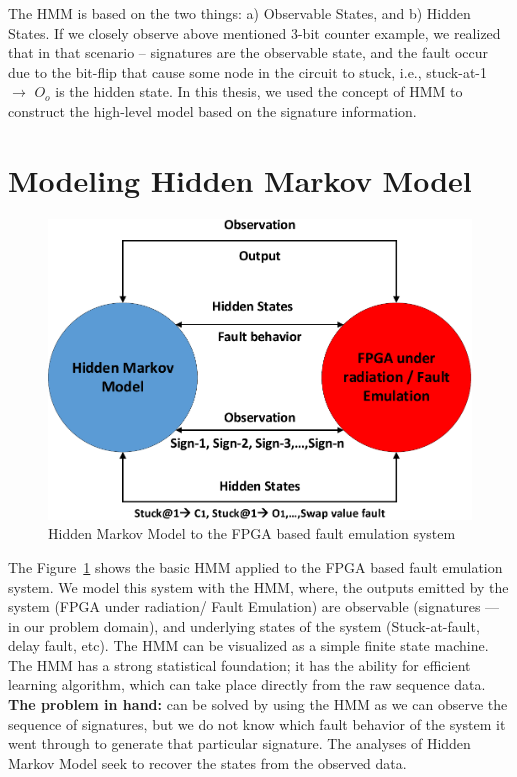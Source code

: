 The HMM is based on  the two things: a) Observable States, and b) Hidden States. If we closely observe above mentioned 3-bit counter example, we realized that in that scenario --  signatures are the observable state, and the fault occur due to the bit-flip that cause some node in the circuit to stuck, i.e., stuck-at-1 $\rightarrow$ $O_o$ is the hidden state. In this thesis, we used the concept of HMM to construct the high-level model based on the signature information.





\section{Modeling Hidden Markov Model}


\begin{figure}[tb!]

 \centering
  \captionsetup{justification=centering}    
   \includegraphics[scale=0.8]{Figures/HMM-air.pdf}
   \caption{Hidden Markov Model to the FPGA based fault emulation system}
\label{fig:HMM-air}
\end{figure}


The Figure~\ref{fig:HMM-air} shows the basic HMM applied to the FPGA based fault emulation system. We model this system with the HMM, where, the outputs emitted by the system (FPGA under radiation/ Fault Emulation) are observable (signatures --- in our problem domain), and underlying states of the system (Stuck-at-fault, delay fault, etc). The HMM can be visualized as a simple finite state machine. The HMM has a strong statistical foundation; it has the ability for efficient learning algorithm, which can take place directly from the raw sequence data. \textbf{The problem in hand:} can be solved by using the HMM as we can observe the sequence of signatures, but we do not know  which fault behavior  of the system it went through to generate that particular signature. The analyses of Hidden Markov Model seek to recover the states from the observed data.








